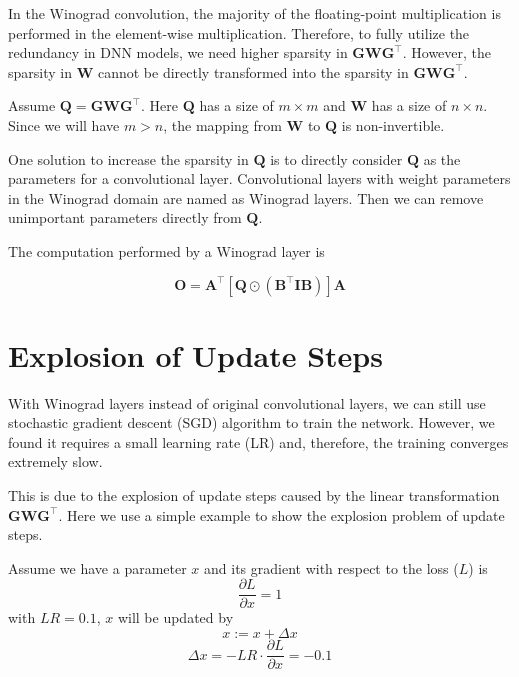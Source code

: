 \documentclass[12pt]{article} %
\begin{document}
In the Winograd convolution, the majority of the floating-point multiplication is performed in the element-wise multiplication. Therefore, to fully utilize the redundancy in DNN models, we need higher sparsity in $\boldsymbol{G} \boldsymbol{W} \boldsymbol{G}^{\top}$. However, the sparsity in $\boldsymbol{W}$ cannot be directly transformed into the sparsity in $\boldsymbol{G} \boldsymbol{W} \boldsymbol{G}^{\top}$.

Assume $\boldsymbol{Q} = \boldsymbol{G} \boldsymbol{W} \boldsymbol{G}^{\top}$. Here $\boldsymbol{Q}$ has a size of $m \times m$ and $\boldsymbol{W}$ has a size of $n \times n$. Since we will have $m > n$, the mapping from $\boldsymbol{W}$ to $\boldsymbol{Q}$ is non-invertible.

One solution to increase the sparsity in $\boldsymbol{Q}$ is to directly consider $\boldsymbol{Q}$ as the parameters for a convolutional layer. Convolutional layers with weight parameters in the Winograd domain are named as Winograd layers. Then we can remove unimportant parameters directly from $\boldsymbol{Q}$.

The computation performed by a Winograd layer is

\begin{equation}
	\boldsymbol{O} = \boldsymbol{A}^{\top} \left [ \boldsymbol{Q} \odot (\boldsymbol{B}^{\top} \boldsymbol{I} \boldsymbol{B}) \right ] \boldsymbol{A}
\end{equation}

\section{Explosion of Update Steps}

With Winograd layers instead of original convolutional layers, we can still use stochastic gradient descent (SGD) algorithm to train the network. However, we found it requires a small learning rate (LR) and, therefore, the training converges extremely slow.

This is due to the explosion of update steps caused by the linear transformation $\boldsymbol{G} \boldsymbol{W} \boldsymbol{G}^{\top}$. Here we use a simple example to show the explosion problem of update steps.

Assume we have a parameter $x$ and its gradient with respect to the loss ($L$) is
\begin{equation}
	\frac{\partial L}{\partial x} = 1
\end{equation}
with $LR=0.1$, $x$ will be updated by
\begin{equation}
	x := x + \Delta{x}
\end{equation}
\begin{equation}
	\Delta{x} = -LR \cdot \frac{\partial L}{\partial x} = -0.1
\end{equation}
\end{document}
